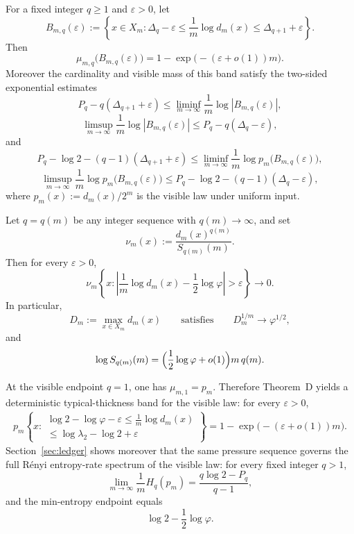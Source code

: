\begin{theoremE}
For a fixed integer \(q\ge 1\) and \(\varepsilon>0\), let
\[
  B_{m,q}(\varepsilon)
  :=
  \left\{
    x\in X_m:
    \Delta_q-\varepsilon\le \frac1m\log d_m(x)\le \Delta_{q+1}+\varepsilon
  \right\}.
\]
Then
\[
  \mu_{m,q}\bigl(B_{m,q}(\varepsilon)\bigr)
  =
  1-\exp\bigl(-(\varepsilon+o(1))m\bigr).
\]
Moreover the cardinality and visible mass of this band satisfy the two-sided
exponential estimates
\[
  P_q-q(\Delta_{q+1}+\varepsilon)
  \le
  \liminf_{m\to\infty}\frac1m\log |B_{m,q}(\varepsilon)|,
\]
\[
  \limsup_{m\to\infty}\frac1m\log |B_{m,q}(\varepsilon)|
  \le
  P_q-q(\Delta_q-\varepsilon),
\]
and
\[
  P_q-\log 2-(q-1)(\Delta_{q+1}+\varepsilon)
  \le
  \liminf_{m\to\infty}\frac1m\log p_m\bigl(B_{m,q}(\varepsilon)\bigr),
\]
\[
  \limsup_{m\to\infty}\frac1m\log p_m\bigl(B_{m,q}(\varepsilon)\bigr)
  \le
  P_q-\log 2-(q-1)(\Delta_q-\varepsilon),
\]
where \(p_m(x):=d_m(x)/2^m\) is the visible law under uniform input.
\end{theoremE}

\begin{theoremF}
Let \(q=q(m)\) be any integer sequence with \(q(m)\to\infty\), and set
\[
  \nu_m(x):=\frac{d_m(x)^{q(m)}}{S_{q(m)}(m)}.
\]
Then for every \(\varepsilon>0\),
\[
  \nu_m\!\left\{
    x:
    \left|\frac1m\log d_m(x)-\frac12\log\varphi\right|>\varepsilon
  \right\}\to 0.
\]
In particular,
\[
  D_m:=\max_{x\in X_m}d_m(x)
  \qquad\text{satisfies}\qquad
  D_m^{1/m}\to\varphi^{1/2},
\]
and
\[
  \log S_{q(m)}(m)
  =
  \Bigl(\frac12\log\varphi+o(1)\Bigr)m\,q(m).
\]
\end{theoremF}

At the visible endpoint \(q=1\), one has \(\mu_{m,1}=p_m\).  Therefore
Theorem~D yields a deterministic typical-thickness band for the visible law:
for every \(\varepsilon>0\),
\[
  \begin{aligned}
    p_m\!\left\{
      x:
      \begin{array}{c}
        \log 2-\log\varphi-\varepsilon
        \le
        \frac1m\log d_m(x) \\[2pt]
        \le
        \log\lambda_2-\log 2+\varepsilon
      \end{array}
    \right\}
    =
    1-\exp\bigl(-(\varepsilon+o(1))m\bigr).
  \end{aligned}
\]
Section~\ref{sec:ledger} shows moreover that the same pressure sequence governs
the full R\'enyi entropy-rate spectrum of the visible law:
for every fixed integer \(q>1\),
\[
  \lim_{m\to\infty}\frac1m H_q(p_m)
  =
  \frac{q\log 2-P_q}{q-1},
\]
and the min-entropy endpoint equals
\[
  \log 2-\frac12\log\varphi.
\]

